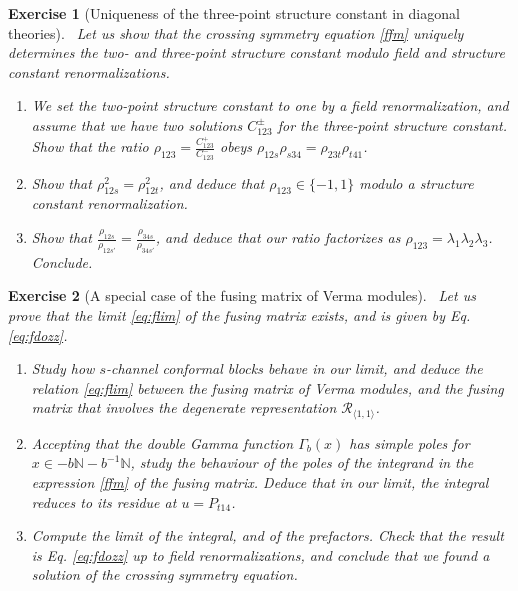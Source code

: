 \documentclass[12pt, a4paper, notitlepage, twoside]{report}
\numberwithin{equation}{section}
\theoremstyle{break}
\newtheorem{exo}{Exercise}[chapter]
\begin{document}
\begin{exo}[Uniqueness of the three-point structure constant in diagonal theories]
 ~\label{exoudt}
 Let us show that the crossing symmetry equation \eqref{ffm} uniquely determines the two- and three-point structure constant modulo field and structure constant renormalizations.
 \begin{enumerate}
  \item 
  We set the two-point structure constant to one by a field renormalization, and assume that we have two solutions $C^\pm_{123}$ for the three-point structure constant. 
  Show that the ratio $\rho_{123}=\frac{C^+_{123}}{C^-_{123}}$ obeys $\rho_{12s}\rho_{s34} = \rho_{23t}\rho_{t41}$.
  \item Show that $\rho_{12s}^2 = \rho_{12t}^2$, and deduce that $\rho_{123}\in\{-1,1\}$ modulo a structure constant renormalization.
  \item Show that $\frac{\rho_{12s}}{\rho_{12s'}} = \frac{\rho_{34s}}{\rho_{34s'}} $, and deduce that our ratio factorizes as $\rho_{123} = \lambda_1\lambda_2\lambda_3$. Conclude.
 \end{enumerate} 
\end{exo}

\begin{exo}[A special case of the fusing matrix of Verma modules]
 ~\label{exoflfg}
 Let us prove that the limit \eqref{eq:flim} of the fusing matrix exists, and is given by Eq. \eqref{eq:fdozz}. 
 \begin{enumerate}
 \item Study how $s$-channel conformal blocks behave in our limit, and deduce the relation \eqref{eq:flim} between the fusing matrix of Verma modules, and the fusing matrix that involves the degenerate representation $\mathcal{R}_{\langle 1,1\rangle}$. 
  \item Accepting that the double Gamma function $\Gamma_b(x)$ has simple poles for $x\in -b\mathbb{N}-b^{-1}\mathbb{N}$, study the behaviour of the poles of the integrand in the expression \eqref{ffm} of the fusing matrix. Deduce that in our limit, the integral reduces to its residue at $u=P_{t14}$.
  \item Compute the limit of the integral, and of the prefactors. Check that the result is Eq. \eqref{eq:fdozz} up to field renormalizations, and conclude that we found a solution of the crossing symmetry equation.
 \end{enumerate}
\end{exo}
\end{document}
